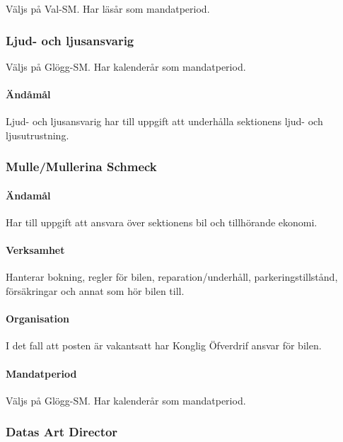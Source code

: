 \documentclass{dgovdoc}
\begin{document}
Väljs på Val-SM. Har läsår som mandatperiod.

\subsubsection{Ljud- och ljusansvarig}

Väljs på Glögg-SM. Har kalenderår som mandatperiod.

\paragraph{Ändåmål}

Ljud- och ljusansvarig har till uppgift att underhålla sektionens ljud- och
ljusutrustning.

\subsubsection{Mulle/Mullerina Schmeck}

\paragraph{Ändamål}

Har till uppgift att ansvara över sektionens bil och tillhörande ekonomi.

\paragraph{Verksamhet}

Hanterar bokning, regler för bilen, reparation/underhåll, parkeringstillstånd,
försäkringar och annat som hör bilen till.

\paragraph{Organisation}

I det fall att posten är vakantsatt har Konglig Öfverdrif ansvar för bilen.

\paragraph{Mandatperiod}

Väljs på Glögg-SM. Har kalenderår som mandatperiod.

\subsubsection{Datas Art Director}
\end{document}
